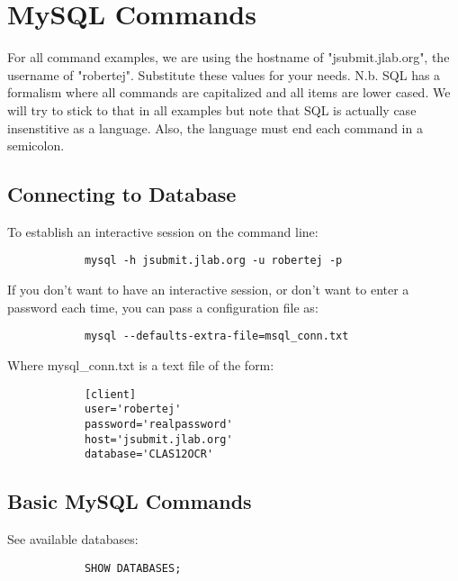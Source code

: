\section{MySQL Commands}
    For all command examples, we are using the hostname of "jsubmit.jlab.org", the username of "robertej". Substitute these values for your needs. N.b. SQL has a formalism where all commands are capitalized and all items are lower cased. We will try to stick to that in all examples but note that SQL is actually case insenstitive as a language. Also, the language must end each command in a semicolon. \\
    
    
    \subsection{Connecting to Database}
        To establish an interactive session on the command line:
        \begin{lstlisting}
            mysql -h jsubmit.jlab.org -u robertej -p 
        \end{lstlisting}
        
        If you don't want to have an interactive session, or don't want to enter a password each time, you can pass a configuration file as:
        
        \begin{lstlisting}
            mysql --defaults-extra-file=msql_conn.txt     
        \end{lstlisting}
        
        Where mysql\_conn.txt is a text file of the form:
        
        \begin{lstlisting}
            [client]                                                                                            
            user='robertej'                                                                                                   
            password='realpassword'
            host='jsubmit.jlab.org'
            database='CLAS12OCR' 
        \end{lstlisting}
    
    \subsection{Basic MySQL Commands}
    
        See available databases:
        
        \begin{lstlisting}
            SHOW DATABASES;
        \end{lstlisting}
        
